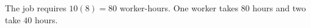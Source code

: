 The job requires $10(8)=80$ worker-hours. One worker takes $\boxed{80}$ hours and two take $\boxed{40}$ hours.
